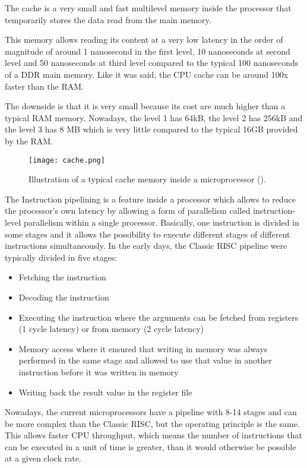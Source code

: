 \par
The cache is a very small and fast multilevel memory inside the processor that temporarily stores the data read from the main memory.
\par
This memory allows reading its content at a very low latency in the order of magnitude of around 1 nanosecond in the first level, 10 nanoseconds at second level and 50 nanoseconds at third level compared to the typical 100 nanoseconds of a DDR main memory.
Like it was said, the CPU cache can be around 100x faster than the RAM.
\par
The downside is that it is very small because its cost are much higher than a typical RAM memory.
Nowadays, the level 1 has 64kB, the level 2 has 256kB and the level 3 has 8 MB which is very little compared to the typical 16GB provided by the RAM.

\begin{figure}[H]
	\centering
	\caption{Illustration of a typical cache memory inside a microprocessor (\cite{CPU_Cache}).}
	\label{Cache.}
	\texttt{[image: cache.png]}
\end{figure}

\par
The Instruction pipelining is a feature inside a processor which allows to reduce the processor's own latency by allowing a form of parallelism called instruction-level parallelism within a single processor.
Basically, one instruction is divided in some stages and it allows the possibility to execute different stages of different instructions simultaneously.
In the early days, the Classic RISC pipeline were typically divided in five stages:
\begin{itemize}  
	\item Fetching the instruction
	\item Decoding the instruction
	\item Executing the instruction where the arguments can be fetched from registers (1 cycle latency) or from memory (2 cycle latency)
	\item Memory access where it ensured that writing in memory was always performed in the same stage and allowed to use that value in another instruction before it was written in memory
	\item Writing back the result value in the register file
\end{itemize}
Nowadays, the current microprocessors have a pipeline with 8-14 stages and can be more complex than the Classic RISC, but the operating principle is the same.
This allows faster CPU throughput, which means the number of instructions that can be executed in a unit of time is greater, than it would otherwise be possible at a given clock rate.

